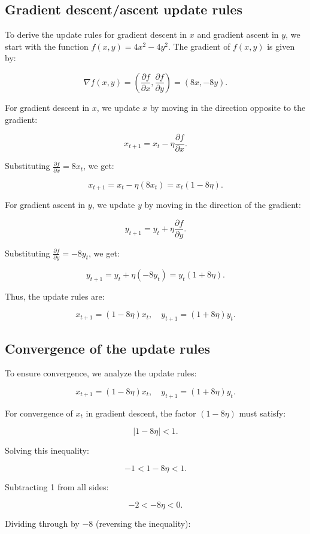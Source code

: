 \documentclass[11pt]{article}
\begin{document}
\subsection{Gradient descent/ascent update rules}

To derive the update rules for gradient descent in \(x\) and gradient ascent in \(y\), we start with the function \(f(x, y) = 4x^2 - 4y^2\). The gradient of \(f(x, y)\) is given by:

\[
\nabla f(x, y) = \left( \frac{\partial f}{\partial x}, \frac{\partial f}{\partial y} \right) = (8x, -8y).
\]

For gradient descent in \(x\), we update \(x\) by moving in the direction opposite to the gradient:

\[
x_{t+1} = x_t - \eta \frac{\partial f}{\partial x}.
\]

Substituting \(\frac{\partial f}{\partial x} = 8x_t\), we get:

\[
x_{t+1} = x_t - \eta (8x_t) = x_t (1 - 8\eta).
\]

For gradient ascent in \(y\), we update \(y\) by moving in the direction of the gradient:

\[
y_{t+1} = y_t + \eta \frac{\partial f}{\partial y}.
\]

Substituting \(\frac{\partial f}{\partial y} = -8y_t\), we get:

\[
y_{t+1} = y_t + \eta (-8y_t) = y_t (1 + 8\eta).
\]

Thus, the update rules are:

\[
x_{t+1} = (1 - 8\eta)x_t, \quad y_{t+1} = (1 + 8\eta)y_t.
\]

\subsection{Convergence of the update rules}

To ensure convergence, we analyze the update rules:

\[
x_{t+1} = (1 - 8\eta)x_t, \quad y_{t+1} = (1 + 8\eta)y_t.
\]

For convergence of \(x_t\) in gradient descent, the factor \((1 - 8\eta)\) must satisfy:

\[
|1 - 8\eta| < 1.
\]

Solving this inequality:

\[
-1 < 1 - 8\eta < 1.
\]

Subtracting 1 from all sides:

\[
-2 < -8\eta < 0.
\]

Dividing through by \(-8\) (reversing the inequality):
\end{document}
